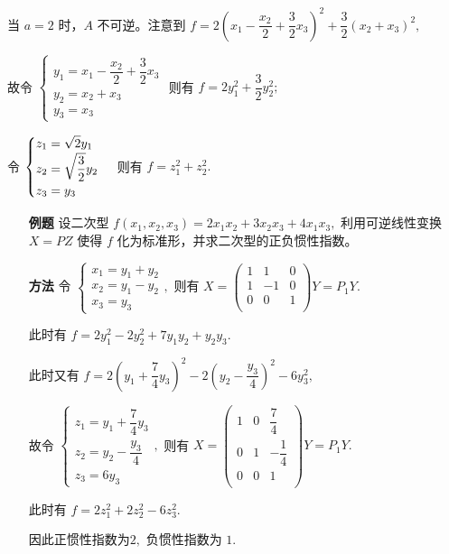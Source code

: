 \begin{itemize}
\begin{enumerate}[label = \Roman*.]
        当 $ a = 2 $ 时，$ A $ 不可逆。注意到 $ f = 2(x_1 - \dfrac{x_2}{2} + \dfrac{3}{2}x_3)^2 +  \dfrac{3}{2}
        (x_2+x_3)^2, $ 
        
        故令
        $\begin{cases}
            y_1 = x_1 - \dfrac{x_2}{2} + \dfrac{3}{2}x_3\\ 
            y_2 = x_2 + x_3\\ y_3 = x_3
        \end{cases}$
        则有 $ f = 2y_1^2 + \dfrac{3}{2}y_2^2; $ 

        令
        $\begin{cases}
            z_1 = \displaystyle\sqrt{2}y_1\\ z_2 = \displaystyle\sqrt{\dfrac{3}{2}}y_2\\ z_3 = y_3
        \end{cases}$
        则有 $ f = z_1^2+z_2^2. $ 
    \end{enumerate}
\end{itemize}

\begin{itemize}
    \item[\textbf{例题}] 设二次型 $ f(x_1,x_2,x_3) = 2x_1x_2 + 3x_2x_3 + 4x_1x_3, $ 
    利用可逆线性变换 $ X = PZ $ 使得 $ f $ 化为标准形，并求二次型的正负惯性指数。
    \item[\textbf{方法}] 
    令 $ \begin{cases}
        x_1 = y_1 + y_2\\ x_2 = y_1 - y_2 \\ x_3 = y_3
    \end{cases}, $ 则有 $ X=\begin{pmatrix}
        1&1&0\\1&-1&0\\0&0&1\\
    \end{pmatrix}Y = P_1Y. $ 
    
    此时有 $ f = 2y_1^2 - 2y_2^2 + 7y_1y_2 + y_2y_3. $ 

    此时又有 $ f = 2(y_1+\dfrac{7}{4}y_3)^2 -2(y_2 - \dfrac{y_3}{4})^2 - 6y_3^2, $ 
    
    故令 $ \begin{cases}
        z_1 = y_1+\dfrac{7}{4}y_3\\ z_2 = y_2 - \dfrac{y_3}{4}\\ z_3 = 6y_3
    \end{cases}, $ 则有 $ X=\begin{pmatrix}
        1&0&\dfrac{7}{4}\\0&1&-\dfrac{1}{4}\\0&0&1\\
    \end{pmatrix}Y = P_1Y. $ 
    
    此时有 $ f = 2z_1^2 + 2z_2^2 - 6z_3^2. $ 
    
    因此正惯性指数为$ 2, $ 负惯性指数为 $ 1. $ 
\end{itemize}

